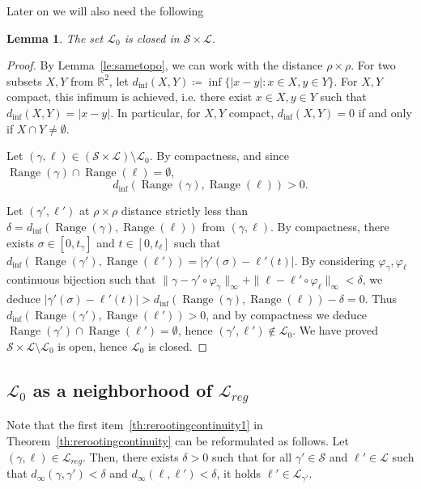 \documentclass[11pt]{article}
\newtheorem{lemma}[theorem]{Lemma}
\DeclareMathOperator{\Range}{Range}
\begin{document}
Later on we will also need the following
\begin{lemma}
  \label{le:closed}
  The set $\mathscr{L}_0$ is closed in $\mathscr{S}\times \mathscr{L}$.
\end{lemma}
\begin{proof}
By Lemma~\ref{le:sametopo}, we can work with the distance $\rho\times \rho$.
  For two subsets $X,Y$ from $\mathbb{R}^2$, let $d_{\inf}(X,Y)\coloneqq \inf \{ |x-y|: x\in X, y\in Y\} $. For $X,Y$ compact, this infimum is achieved, i.e. there exist $x\in X, y\in Y$ such that $d_{\inf}(X,Y)=|x-y|$. In particular, for $X,Y$ compact, $d_{\inf}(X,Y)=0$ if and only if $X\cap Y\neq \emptyset$.

  Let $(\gamma,\ell) \in (\mathscr{S}\times \mathscr{L}) \setminus \mathscr{L}_0$. By compactness, and since $\Range(\gamma)\cap\Range(\ell)=\emptyset$, \[ d_{\inf}(\Range(\gamma),\Range(\ell))>0.\]

  Let $(\gamma',\ell')$ at $\rho\times \rho$ distance strictly less than $\delta=d_{\inf}(\Range(\gamma),\Range(\ell))$ from $(\gamma,\ell)$.
  By compactness, there exists $\sigma\in [0,t_\gamma]$ and $t\in [0,t_\ell]$ such that $d_{\inf}(\Range(\gamma'),\Range(\ell'))=|\gamma'(\sigma)-\ell'(t)| $.
  By considering $\varphi_\gamma,\varphi_\ell$ continuous bijection such that
  $\| \gamma-\gamma'\circ \varphi_\gamma\|_\infty
  +\| \ell-\ell'\circ \varphi_\ell\|_\infty
  <\delta $, we deduce $|\gamma'(\sigma)-\ell'(t)| > d_{\inf}(\Range(\gamma),\Range(\ell))- \delta =0 $. Thus
  $d_{\inf}(\Range(\gamma'),\Range(\ell'))>0$, and by compactness we deduce $\Range(\gamma')\cap \Range(\ell')=\emptyset$, hence $(\gamma',\ell')\notin \mathscr{L}_0$.
  We have proved  $ \mathscr{S}\times \mathscr{L} \setminus \mathscr{L}_0$ is open, hence $\mathscr{L}_0$ is closed.
\end{proof}

\subsection{\texorpdfstring{$\mathscr{L}_0$}{L0} as a neighborhood of \texorpdfstring{$\mathscr{L}_{reg}$}{Lreg}}

\label{SS:32}

Note that the first item~\ref{th:rerootingcontinuity1} in Theorem~\ref{th:rerootingcontinuity} can be reformulated as follows. 
    Let $(\gamma,\ell)\in \mathscr{L}_{reg}$. Then, there exists $\delta>0$ such that for all $\gamma'\in \mathscr{S}$ and $\ell'\in \mathscr{L}$ such that $d_\infty(\gamma,\gamma')<\delta$ and $d_\infty(\ell,\ell')<\delta$, it holds $\ell'\in \mathscr{L}_{\gamma'}$.
    
\end{document}
